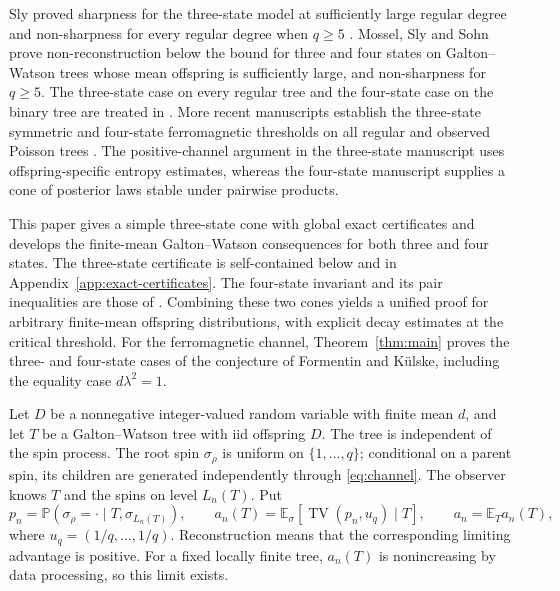 \documentclass[11pt,reqno]{amsart}
\theoremstyle{definition}
\theoremstyle{remark}
\newcommand{\E}{\mathbb E}
\newcommand{\Prob}{\mathbb P}
\newcommand{\TV}{\operatorname{TV}}
\begin{document}
Sly proved sharpness for the three-state model at sufficiently large regular degree and non-sharpness for every regular degree when $q\ge5$ \cite{Sly2011}. Mossel, Sly and Sohn \cite{MSS25} prove non-reconstruction below the bound for three and four states on Galton--Watson trees whose mean offspring is sufficiently large, and non-sharpness for $q\ge5$. The three-state case on every regular tree and the four-state case on the binary tree are treated in \cite{ShmQ3,ShmQ4}. More recent manuscripts establish the three-state symmetric and four-state ferromagnetic thresholds on all regular and observed Poisson trees \cite{OpenAI3,OpenAI4}. The positive-channel argument in the three-state manuscript uses offspring-specific entropy estimates, whereas the four-state manuscript supplies a cone of posterior laws stable under pairwise products.

This paper gives a simple three-state cone with global exact certificates and develops the finite-mean Galton--Watson consequences for both three and four states. The three-state certificate is self-contained below and in Appendix~\ref{app:exact-certificates}. The four-state invariant and its pair inequalities are those of \cite{OpenAI4}. Combining these two cones yields a unified proof for arbitrary finite-mean offspring distributions, with explicit decay estimates at the critical threshold. For the ferromagnetic channel, Theorem~\ref{thm:main} proves the three- and four-state cases of the conjecture of Formentin and K\"ulske, including the equality case $d\lambda^2=1$.

Let $D$ be a nonnegative integer-valued random variable with finite mean $d$, and let $T$ be a Galton--Watson tree with iid offspring $D$. The tree is independent of the spin process. The root spin $\sigma_\rho$ is uniform on $\{1,\ldots,q\}$; conditional on a parent spin, its children are generated independently through \eqref{eq:channel}. The observer knows $T$ and the spins on level $L_n(T)$. Put
\begin{equation}\label{eq:advantage}
 p_n=\Prob(\sigma_\rho=\cdot\mid T,\sigma_{L_n(T)}),\qquad
 a_n(T)=\E_\sigma[\TV(p_n,u_q)\mid T],\qquad
 a_n=\E_T a_n(T),
\end{equation}
where $u_q=(1/q,\ldots,1/q)$. Reconstruction means that the corresponding limiting advantage is positive. For a fixed locally finite tree, $a_n(T)$ is nonincreasing by data processing, so this limit exists.
\end{document}
